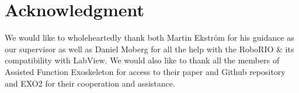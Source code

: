 \section*{Acknowledgment}

We would like to wholeheartedly thank both Martin Ekström for his guidance as our supervisor as well as Daniel Moberg for all the help with
the RoboRIO \& its compatibility with LabView. We would also like to thank all the members of Assisted Function Exoskeleton for 
access to their paper and Github repository and EXO2 for their cooperation and assistance.